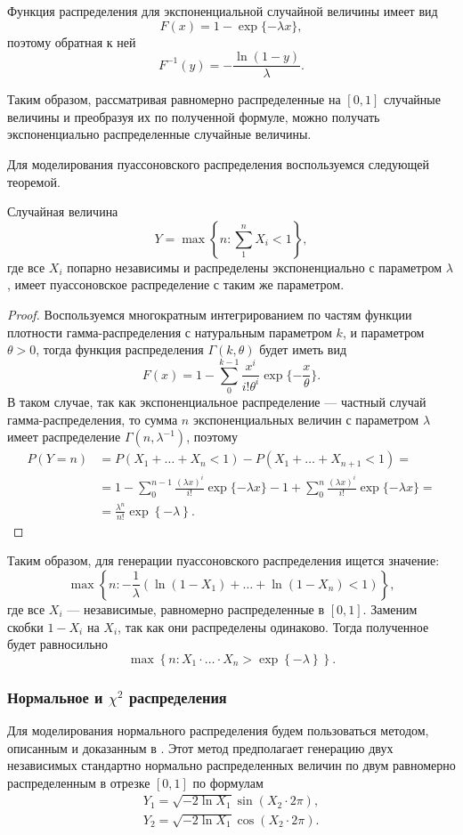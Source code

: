 \documentclass[12pt, a4paper]{article}
\begin{document}
Функция распределения для экспоненциальной случайной величины имеет вид \[ F(x) = 1 - \exp \{-\lambda x\}, \]
поэтому обратная к ней
\[F^{-1}(y) = -\frac{\ln \left(1 - y\right)}{\lambda}.\]

Таким образом, рассматривая равномерно распределенные на $[0,1]$ случайные величины и преобразуя их по полученной формуле, можно получать экспоненциально распределенные случайные величины.

Для моделирования пуассоновского распределения воспользуемся следующей теоремой.
\begin{theorem}
Случайная величина \[Y = \max\left\{n\colon \sum\limits_1^n X_i < 1 \right\},\]
где все $X_i$ попарно независимы и распределены экспоненциально с параметром $\lambda$, имеет пуассоновское распределение с таким же параметром.
\end{theorem}
\begin{proof}
Воспользуемся многократным интегрированием по частям функции плотности гамма-распределения с натуральным параметром $k$, и параметром $\theta > 0$, тогда функция распределения $\Gamma(k,\theta)$ будет иметь вид \[ F(x) = 1 - \sum\limits_0^{k-1} \frac{x^i}{i!\theta^i}\exp\{-\frac{x}{\theta}\}  .\]
В таком случае, так как экспоненциальное распределение --- частный случай гамма-распределения, то сумма $n$ экспоненциальных величин с параметром $\lambda$ имеет распределение $\Gamma(n,\lambda^{-1})$, поэтому
\begin{align*}
P(Y = n) &= P(X_1+\ldots+X_n < 1) - P(X_1+\ldots+X_{n+1} < 1) = \\ 
& = 1 - \sum\limits_0^{n-1} \frac{(\lambda x)^i}{i!}\exp\{-\lambda x\} -
    1 + \sum\limits_0^{n} \frac{(\lambda x)^i}{i!}\exp\{-\lambda x\} = \\
&   =\frac{\lambda^n}{n!}\exp \left\{ -\lambda \right\}.
\end{align*}
\end{proof}
Таким образом, для генерации пуассоновского распределения ищется значение:
\[\max\left\{n\colon -\frac 1\lambda\left(\ln(1-X_1)+\ldots+\ln(1-X_n)<1\right)\right\},\]
где все $X_i$ --- независимые, равномерно распределенные в $[0,1]$.
Заменим скобки $1-X_i$ на $X_i$, так как они распределены одинаково. Тогда полученное будет равносильно
\[ \max\left\{n\colon X_1\cdot\ldots\cdot X_n > \exp\left\{ -\lambda \right\}\right\}.\]

\subsubsection{Нормальное и $\chi^2$ распределения}
Для моделирования нормального распределения будем пользоваться методом, описанным и доказанным в \cite{Box_Muller}. Этот метод предполагает генерацию двух независимых стандартно нормально распределенных величин по двум равномерно распределенным в отрезке $[0,1]$ по формулам
\begin{align*}
Y_1 = \sqrt{ -2\ln X_1 } \sin(X_2\cdot 2\pi), \\
Y_2 = \sqrt{ -2\ln X_1 } \cos(X_2\cdot 2\pi).
\end{align*}
\end{document}
